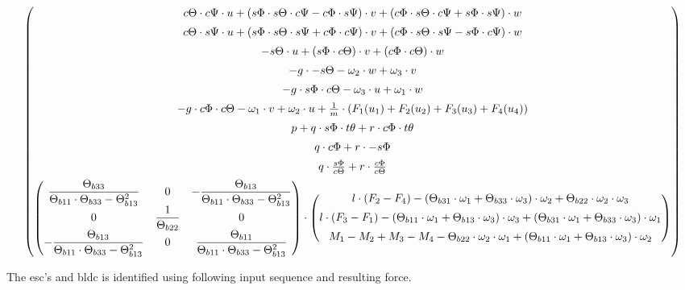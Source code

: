 \begin{align}
\begin{pmatrix}
		c{\Theta} \cdot c{\Psi} \cdot u + (s{\Phi}\cdot s{\Theta} \cdot c{\Psi} - c{\Phi} \cdot s{\Psi}) \cdot v + \left(c{\Phi} \cdot s{\Theta} \cdot c{\Psi} +s{\Phi} \cdot s{\Psi} \right) \cdot w \\[0.5em]
		c{\Theta} \cdot s{\Psi} \cdot u + (s{\Phi} \cdot s{\Theta} \cdot s{\Psi} + c{\Phi} \cdot c{\Psi}) \cdot v + \left( c{\Phi} \cdot s{\Theta} \cdot s{\Psi} - s{\Phi} \cdot c{\Psi} \right) \cdot w \\[0.5em]
		- s{\Theta} \cdot u + \left(s{\Phi} \cdot c{\Theta} \right) \cdot v + \left( c{\Phi} \cdot c{\Theta} \right) \cdot w \\[0.5em]
		-g \cdot - s{\Theta} - \omega_2 \cdot w + \omega_3 \cdot v	\\[0.5em]
		-g \cdot s{\Phi} \cdot c{\Theta} - \omega_3 \cdot u + \omega_1 \cdot w \\[0.5em]
		-g \cdot c{\Phi} \cdot c{\Theta} - \omega_1 \cdot v + \omega_2 \cdot u + \frac{1}{m} \cdot \left( F_1(u_{1}) + F_2(u_{2}) + F_3(u_{3}) + F_4(u_{4}) \right)
		\\[0.5em]
		p + q \cdot s{\Phi}\cdot t{\theta} + r \cdot c{\Phi} \cdot t{\theta} \\[0.5em]
		q \cdot c{\Phi} + r \cdot -s{\Phi} \\[0.5em]
		q \cdot \frac{s{\Phi}}{c{\Theta}} + r \cdot \frac{c{\Phi}}{c{\Theta}} 
		\\[0.5em]
		\begin{pmatrix}
		\dfrac{\Theta_{b33}}{\Theta_{b11} \cdot \Theta_{b33} - \Theta_{b13}^2} & 0 & -\dfrac{\Theta_{b13}}{\Theta_{b11} \cdot \Theta_{b33} - \Theta_{b13}^2} \\
		0  & \dfrac{1}{\Theta_{b22}} & 0 \\
		-\dfrac{\Theta_{b13}}{\Theta_{b11} \cdot \Theta_{b33} - \Theta_{b13}^2} & 0 & \dfrac{\Theta_{b11}}{\Theta_{b11} \cdot \Theta_{b33} - \Theta_{b13}^2}
		\end{pmatrix}
		\cdot 
		\begin{pmatrix} l\cdot(F_2 - F_4) - \left(\Theta_{b31} \cdot \omega_1 + \Theta_{b33} \cdot \omega_3 \right) \cdot \omega_2 + \Theta_{b22} \cdot \omega_2 \cdot \omega_3  
		\\[0.5em]
		l\cdot(F_3 - F_1) - \left(\Theta_{b11} \cdot \omega_1 + \Theta_{b13} \cdot \omega_3 \right) \cdot \omega_3 + \left(\Theta_{b31} \cdot \omega_1 + \Theta_{b33} \cdot \omega_3 \right) \cdot \omega_1 
		\\[0.5em]
		M_1 - M_2 + M_3 - M_4 - \Theta_{b22} \cdot \omega_2 \cdot \omega_1 + \left(\Theta_{b11} \cdot \omega_1 +  \Theta_{b13} \cdot \omega_3 \right) \cdot \omega_2
		\end{pmatrix}
	\end{pmatrix}
\end{align}

\clearpage

The esc's and bldc is identified using following input sequence and resulting force.


